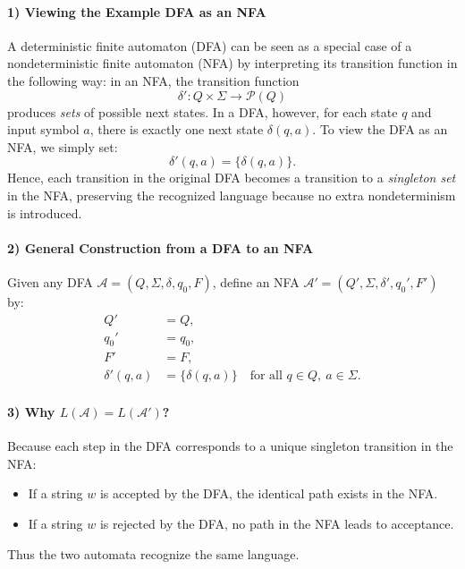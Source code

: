 \documentclass{article}
\theoremstyle{theorem}
\theoremstyle{definition}
\theoremstyle{remark}
\begin{document}
\paragraph{1) Viewing the Example DFA as an NFA}  
A deterministic finite automaton (DFA) can be seen as a special case of a nondeterministic finite automaton (NFA) by interpreting its transition function in the following way: in an NFA, the transition function 
\[
\delta': Q \times \Sigma \to \mathcal{P}(Q)
\]
produces \emph{sets} of possible next states. In a DFA, however, for each state \(q\) and input symbol \(a\), there is exactly one next state \(\delta(q,a)\). To view the DFA as an NFA, we simply set:
\[
\delta'(q,a) = \{\delta(q,a)\}.
\]
Hence, each transition in the original DFA becomes a transition to a \emph{singleton set} in the NFA, preserving the recognized language because no extra nondeterminism is introduced.

\paragraph{2) General Construction from a DFA to an NFA}  
Given any DFA 
\(\mathcal{A} = (Q, \Sigma, \delta, q_0, F)\),
define an NFA
\(\mathcal{A}' = (Q', \Sigma, \delta', q_0', F')\) by:
\[
\begin{aligned}
Q' &= Q,\\
q_0' &= q_0,\\
F' &= F,\\
\delta'(q,a) &= \{\delta(q,a)\} \quad\text{for all }q\in Q,\ a\in\Sigma.
\end{aligned}
\]

\paragraph{3) Why \(L(\mathcal{A}) = L(\mathcal{A}')\)?}  
Because each step in the DFA corresponds to a unique singleton transition in the NFA:
\begin{itemize}
  \item If a string \(w\) is accepted by the DFA, the identical path exists in the NFA.
  \item If a string \(w\) is rejected by the DFA, no path in the NFA leads to acceptance.
\end{itemize}
Thus the two automata recognize the same language.
\end{document}
